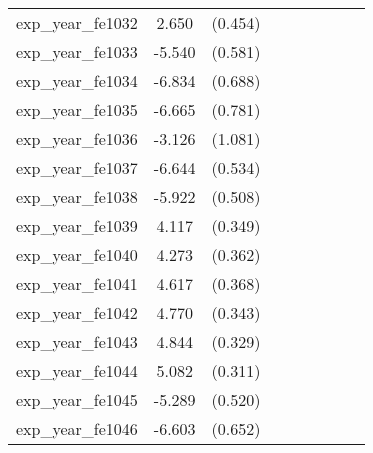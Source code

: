 {\begin{tabular}{l*{4}{cc}}
exp\_year\_fe1032&    2.650\sym{***}&  (0.454)&                  &         &                  &         &                  &         \\
exp\_year\_fe1033&   -5.540\sym{***}&  (0.581)&                  &         &                  &         &                  &         \\
exp\_year\_fe1034&   -6.834\sym{***}&  (0.688)&                  &         &                  &         &                  &         \\
exp\_year\_fe1035&   -6.665\sym{***}&  (0.781)&                  &         &                  &         &                  &         \\
exp\_year\_fe1036&   -3.126\sym{**} &  (1.081)&                  &         &                  &         &                  &         \\
exp\_year\_fe1037&   -6.644\sym{***}&  (0.534)&                  &         &                  &         &                  &         \\
exp\_year\_fe1038&   -5.922\sym{***}&  (0.508)&                  &         &                  &         &                  &         \\
exp\_year\_fe1039&    4.117\sym{***}&  (0.349)&                  &         &                  &         &                  &         \\
exp\_year\_fe1040&    4.273\sym{***}&  (0.362)&                  &         &                  &         &                  &         \\
exp\_year\_fe1041&    4.617\sym{***}&  (0.368)&                  &         &                  &         &                  &         \\
exp\_year\_fe1042&    4.770\sym{***}&  (0.343)&                  &         &                  &         &                  &         \\
exp\_year\_fe1043&    4.844\sym{***}&  (0.329)&                  &         &                  &         &                  &         \\
exp\_year\_fe1044&    5.082\sym{***}&  (0.311)&                  &         &                  &         &                  &         \\
exp\_year\_fe1045&   -5.289\sym{***}&  (0.520)&                  &         &                  &         &                  &         \\
exp\_year\_fe1046&   -6.603\sym{***}&  (0.652)&                  &         &                  &         &                  &         \\

\end{tabular}}
